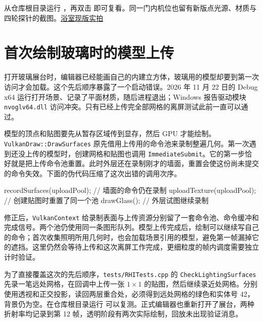 从仓库根目录运行 ，再双击  即可复看。同一门内机位也留有新版点光源、材质与四轮探针的截图。\href{run:../profiling/point-materials/bathroom-pbr.png}{浴室现版实拍}


\clearpage
\section{首次绘制玻璃时的模型上传}
打开玻璃展台时，编辑器已经能画自己的内建立方体，玻璃用的模型却要到第一次访问才会加载。这个先后顺序暴露了一个启动错误。2026 年 11 月 22 日的 Debug x64 运行打开场景、记录了平面材质，随后进程退出；Windows 报告驱动模块 \verb|nvoglv64.dll| 访问冲突。只有已经上传完全部网格的离屏测试此前一直可以通过。

模型的顶点和贴图要先从暂存区域传到显存，然后 GPU 才能绘制。\verb|VulkanDraw::DrawSurfaces| 原先借用上传用的命令池来录制整遍几何。第一次遇到还没上传的模型时，创建网格和贴图也调用 \verb|ImmediateSubmit|。它的第一步恰好就是把上传命令池重置。此时外层还在录制刚才的墙面，重置会使这份尚未提交的命令失效。下面的伪代码压缩了这次出错的调用次序。

\begin{Code}
recordSurfaces(uploadPool);     // 墙面的命令仍在录制
    uploadTexture(uploadPool);  // 创建贴图时重置了同一个池
    drawGlass();                // 外层试图继续录制
\end{Code}

修正后，\verb|VulkanContext| 给录制表面与上传资源分别留了一套命令池、命令缓冲和完成信号。两个池仍使用同一条图形队列。模型上传完成后，绘制可以继续写自己的命令；首次收集照明所用几何时，也会加载场景引用的模型，避免第一帧漏掉它的遮挡。这里仍然会等待上传和这次离屏工作完成，更细粒度的帧内调度需要独立计时验证。

为了直接覆盖这次的先后顺序，\verb|tests/RHITests.cpp| 的 \verb|CheckLightingSurfaces| 先录一笔远处网格，在回调中上传一张 $1\times1$ 的贴图，然后继续录近处网格。分别使用透视和正交投影，读回两层重合处，必须得到远处网格的绿色和实体号 42，背景仍为空。在仓库根目录运行  可以复测。正式编辑器也重新打开了展台，两种折射率均记录到第 12 帧，透明阶段有两次实际绘制，回放未出现验证消息。

